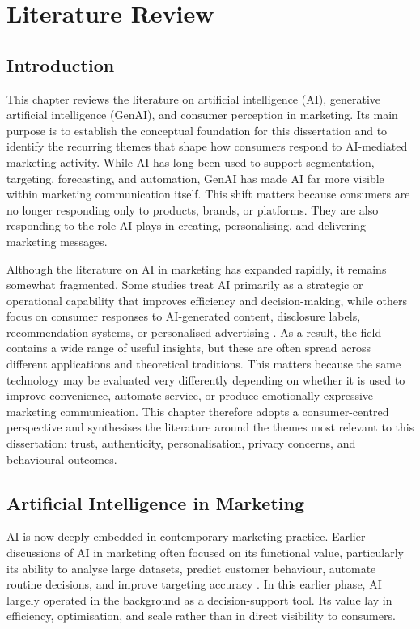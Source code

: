 \chapter{Literature Review}

\section{Introduction}
This chapter reviews the literature on artificial intelligence (AI), generative artificial intelligence (GenAI), and consumer perception in marketing. Its main purpose is to establish the conceptual foundation for this dissertation and to identify the recurring themes that shape how consumers respond to AI-mediated marketing activity. While AI has long been used to support segmentation, targeting, forecasting, and automation, GenAI has made AI far more visible within marketing communication itself. This shift matters because consumers are no longer responding only to products, brands, or platforms. They are also responding to the role AI plays in creating, personalising, and delivering marketing messages.

Although the literature on AI in marketing has expanded rapidly, it remains somewhat fragmented. Some studies treat AI primarily as a strategic or operational capability that improves efficiency and decision-making, while others focus on consumer responses to AI-generated content, disclosure labels, recommendation systems, or personalised advertising \cite{davenport2020future,haleem2022ai,kumar2024aipowered,chan2025genai}. As a result, the field contains a wide range of useful insights, but these are often spread across different applications and theoretical traditions. This matters because the same technology may be evaluated very differently depending on whether it is used to improve convenience, automate service, or produce emotionally expressive marketing communication. This chapter therefore adopts a consumer-centred perspective and synthesises the literature around the themes most relevant to this dissertation: trust, authenticity, personalisation, privacy concerns, and behavioural outcomes.

\section{Artificial Intelligence in Marketing}
AI is now deeply embedded in contemporary marketing practice. Earlier discussions of AI in marketing often focused on its functional value, particularly its ability to analyse large datasets, predict customer behaviour, automate routine decisions, and improve targeting accuracy \cite{haleem2022ai,jain2024twodecades}. In this earlier phase, AI largely operated in the background as a decision-support tool. Its value lay in efficiency, optimisation, and scale rather than in direct visibility to consumers.

